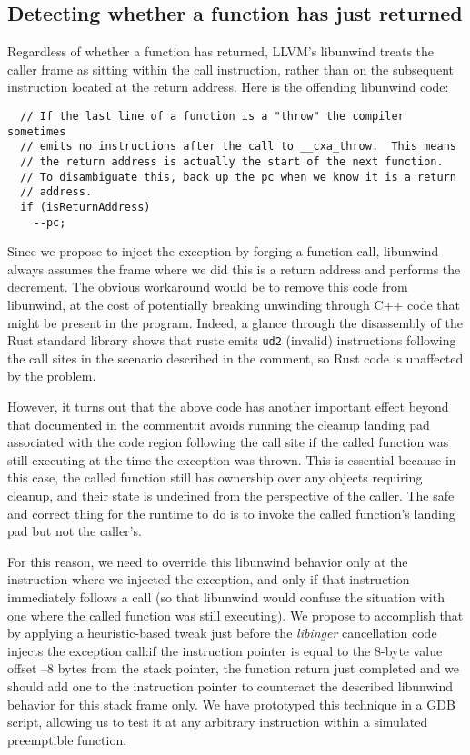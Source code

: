 \subsection{Detecting whether a function has just returned}
\label{sec:ingerc:return}

Regardless of whether a function has returned, LLVM's libunwind treats the caller
frame as sitting within the call instruction, rather than on the subsequent
instruction located at the return address.  Here is the offending libunwind code:
\begin{lstlisting}
  // If the last line of a function is a "throw" the compiler sometimes
  // emits no instructions after the call to __cxa_throw.  This means
  // the return address is actually the start of the next function.
  // To disambiguate this, back up the pc when we know it is a return
  // address.
  if (isReturnAddress)
  	--pc;
\end{lstlisting}

Since we propose to inject the exception by forging a function call, libunwind always
assumes
the frame where we did this is a return address and performs the decrement.  The
obvious workaround would be to remove this code from libunwind, at the cost of
potentially breaking unwinding through C++ code that might be present in the program.
Indeed, a glance through the disassembly of the Rust standard library shows that
rustc emits \texttt{ud2} (invalid) instructions following the call sites in the
scenario described in the comment, so Rust code is unaffected by the problem.

However, it turns out that the above code has another important effect beyond that
documented in the comment:\@ it avoids running the cleanup landing pad associated
with the code region following the call site if the called function was still
executing at the time the exception was thrown.  This is essential because in this
case, the called function still has ownership over any objects requiring cleanup, and
their state is undefined from the perspective of the caller.  The safe and correct
thing for the runtime to do is to invoke the called function's landing pad but not
the caller's.

For this reason, we need to override this libunwind behavior only at the instruction
where we injected the exception, and only if that instruction immediately
follows a call (so that libunwind would confuse the situation with one
where the called function was still executing).  We propose to accomplish that by
applying
a heuristic-based tweak just before the \textit{libinger} cancellation code injects
the exception call:\@ if the instruction pointer is equal to the 8-byte value offset
--8 bytes from the stack pointer, the function return just completed and we should
add one to the instruction pointer to counteract the described libunwind behavior for
this stack frame only.  We have prototyped this technique in a GDB script, allowing
us to test it at any arbitrary instruction within a simulated preemptible function.


